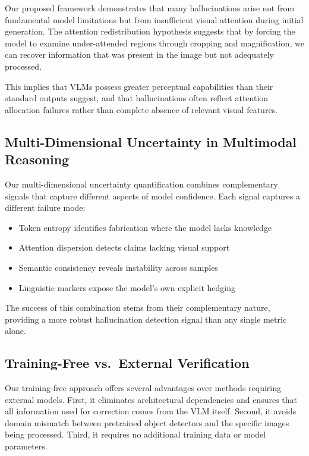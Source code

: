 \documentclass[12pt]{article}
\begin{document}
Our proposed framework demonstrates that many hallucinations arise not from fundamental model limitations but from insufficient visual attention during initial generation. The attention redistribution hypothesis suggests that by forcing the model to examine under-attended regions through cropping and magnification, we can recover information that was present in the image but not adequately processed.

This implies that VLMs possess greater perceptual capabilities than their standard outputs suggest, and that hallucinations often reflect attention allocation failures rather than complete absence of relevant visual features.

\subsection{Multi-Dimensional Uncertainty in Multimodal Reasoning}

Our multi-dimensional uncertainty quantification combines complementary signals that capture different aspects of model confidence. Each signal captures a different failure mode:
\begin{itemize}
\item Token entropy identifies fabrication where the model lacks knowledge
\item Attention dispersion detects claims lacking visual support
\item Semantic consistency reveals instability across samples
\item Linguistic markers expose the model's own explicit hedging
\end{itemize}

The success of this combination stems from their complementary nature, providing a more robust hallucination detection signal than any single metric alone.

\subsection{Training-Free vs.\ External Verification}

Our training-free approach offers several advantages over methods requiring external models. First, it eliminates architectural dependencies and ensures that all information used for correction comes from the VLM itself. Second, it avoids domain mismatch between pretrained object detectors and the specific images being processed. Third, it requires no additional training data or model parameters.
\end{document}
